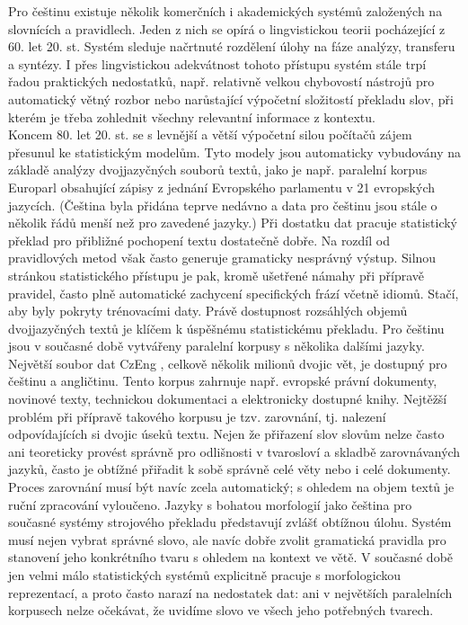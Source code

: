 \begin{multicols}{2}
Pro češtinu existuje několik komerčních i akademických systémů založených na slovnících a pravidlech. Jeden z nich se opírá o lingvistickou teorii pocházející z 60. let 20. st. Systém sleduje načrtnuté rozdělení úlohy na fáze analýzy, transferu a syntézy. I přes lingvistickou adekvátnost tohoto přístupu systém stále trpí řadou praktických nedostatků, např. relativně velkou chybovostí nástrojů pro automatický větný rozbor nebo narůstající výpočetní složitostí překladu slov, při kterém je třeba zohlednit všechny relevantní informace z kontextu.\\
Koncem 80. let 20. st. se s levnější a větší výpočetní silou počítačů zájem přesunul ke statistickým modelům. Tyto modely jsou automaticky vybudovány na základě analýzy dvojjazyčných souborů textů, jako je např. paralelní korpus Europarl obsahující zápisy z jednání Evropského parlamentu v 21 evropských jazycích. (Čeština byla přidána teprve nedávno a data pro češtinu jsou stále o několik řádů menší než pro zavedené jazyky.) Při dostatku dat pracuje statistický překlad pro přibližné pochopení textu dostatečně dobře. Na rozdíl od pravidlových metod však často generuje gramaticky nesprávný výstup. Silnou stránkou statistického přístupu je pak, kromě ušetřené námahy při přípravě pravidel, často plně automatické zachycení specifických frází včetně idiomů. Stačí, aby byly pokryty trénovacími daty. Právě dostupnost rozsáhlých objemů dvojjazyčných textů je klíčem k úspěšnému statistickému překladu. Pro češtinu jsou v současné době vytvářeny paralelní korpusy s několika dalšími jazyky. Největší soubor dat CzEng \cite{Note20}, celkově několik milionů dvojic vět, je dostupný pro češtinu a angličtinu. Tento korpus zahrnuje např. evropské právní dokumenty, novinové texty, technickou dokumentaci a elektronicky dostupné knihy. Nejtěžší problém při přípravě takového korpusu je tzv. zarovnání, tj. nalezení odpovídajících si dvojic úseků textu. Nejen že přiřazení slov slovům nelze často ani teoreticky provést správně pro odlišnosti v tvarosloví a skladbě zarovnávaných jazyků, často je obtížné přiřadit k sobě správně celé věty nebo i celé dokumenty. Proces zarovnání musí být navíc zcela automatický; s ohledem na objem textů je ruční zpracování vyloučeno. Jazyky s bohatou morfologií jako čeština pro současné systémy strojového překladu představují zvlášť obtížnou úlohu. Systém musí nejen vybrat správné slovo, ale navíc dobře zvolit gramatická pravidla pro stanovení jeho konkrétního tvaru s ohledem na kontext ve větě. V současné době jen velmi málo statistických systémů explicitně pracuje s morfologickou reprezentací, a proto často narazí na nedostatek dat: ani v největších paralelních korpusech nelze očekávat, že uvidíme slovo ve všech jeho potřebných tvarech.


\end{multicols}
